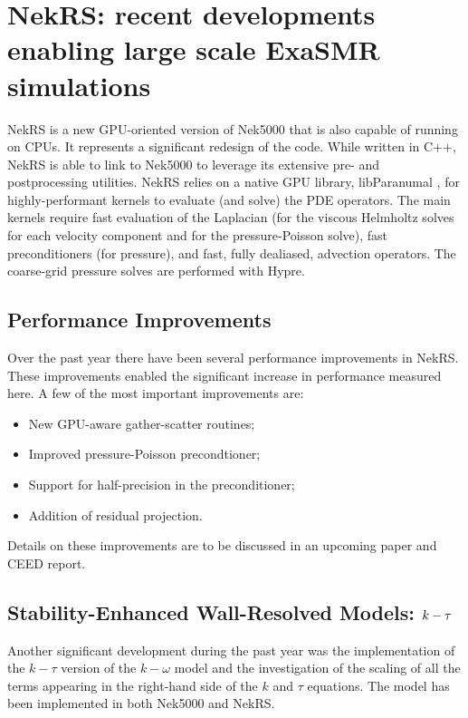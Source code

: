 \section{NekRS: recent developments enabling large scale ExaSMR simulations}
\label{sec:nekrs}

NekRS is a new GPU-oriented version of Nek5000  that is also capable of running
on CPUs. It represents a significant redesign of the code. While written in
C++, NekRS is able to link to Nek5000 to leverage its extensive pre- and
postprocessing utilities. NekRS relies on a native GPU library,
libParanumal \cite{libP}, for highly-performant kernels to evaluate (and
solve) the PDE operators.  The main kernels require fast evaluation of the
Laplacian (for the viscous Helmholtz solves for each velocity component and
for the pressure-Poisson solve), fast preconditioners (for pressure), and
fast, fully dealiased, advection operators.  The coarse-grid pressure solves
are performed with Hypre.

\subsection{Performance Improvements}

Over the past year there have been several performance improvements in NekRS. These improvements enabled the significant increase in performance measured here.
A few of the most important improvements are:
\begin{itemize}
  \item New GPU-aware gather-scatter routines;
  \item Improved pressure-Poisson precondtioner;
  \item Support for half-precision in the preconditioner;
  \item Addition of residual projection.
\end{itemize}
Details on these improvements are to be discussed in an upcoming paper and CEED report.

\subsection{Stability-Enhanced Wall-Resolved Models: $\lowercase{k}-\tau$}
Another significant development during the past year was the implementation of the $k-\tau$
version of the $k-\omega$ model and the investigation of the scaling of all the terms appearing in
the right-hand side of the $k$ and $\tau$ equations. The model has been implemented in both Nek5000 \cite{shaver2020nek5000} and NekRS.

